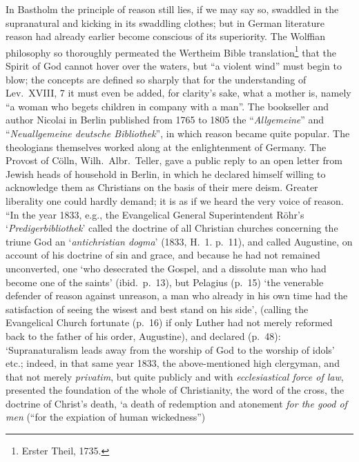 \documentclass[12pt,a4paper]{article}
\newcommand{\opage}[1]{\marginnote{\footnotesize\textit{[#1]}}}
\begin{document}
In Bastholm the principle of reason still lies, if we may say so, swaddled
in the supranatural and kicking in its swaddling clothes; but in
\opage{30}German literature reason had already earlier become conscious of its
superiority. The Wolffian philosophy so thoroughly permeated the Wertheim
Bible translation\footnote{Erster Theil, 1735.} %
that the Spirit of God cannot hover over the waters, but ``a violent wind''
must begin to blow; the concepts are defined so sharply that for the
understanding of Lev.\ XVIII, 7 it must even be added, for clarity's sake,
what a mother is, namely ``a woman who begets children in company with a
man''. The bookseller and author Nicolai in Berlin published from 1765 to
1805 the ``\textit{Allgemeine}'' and ``\textit{Neuallgemeine deutsche
Bibliothek}'', in which reason became quite popular. The theologians
themselves worked along at the enlightenment of Germany. The Provost of
Cölln, Wilh.\ Albr.\ Teller, gave a public reply to an open letter from
Jewish heads of household in Berlin, in which he declared himself willing to
acknowledge them as Christians on the basis of their mere deism. Greater
liberality one could hardly demand; it is as if we heard the very voice of
reason. ``In the year 1833, e.g., the Evangelical General Superintendent
Röhr's `\textit{Predigerbibliothek}' called the doctrine of all Christian
churches concerning the triune God an `\emph{antichristian dogma}' (1833,
H.\ 1. p.\ 11), and called Augustine, on account of his doctrine of sin and
grace, and because he had not remained unconverted, one `who desecrated the
Gospel, and a dissolute man who had become one of the saints' (ibid.\ p.\
13), but Pelagius (p.\ 15) `the venerable defender of reason against
unreason, a man who already in his own time had the satisfaction of seeing
the wisest and best stand on his side', (calling the Evangelical Church
fortunate (p.\ 16) if only Luther had not merely reformed back to the father
of his order, Augustine), and declared (p.\ 48): `Supranaturalism leads away
from the worship of God to the worship of idols' etc.; indeed, in that same
year 1833, the above-mentioned high clergyman, and that not merely
\emph{privatim}, but quite publicly and with \emph{ecclesiastical force of
law}, presented the foundation of the whole of Christianity, the word of the
cross, the doctrine of Christ's death, `a death of redemption and atonement
\emph{for the good of men} (``for the expiation of human wickedness'')
\end{document}
